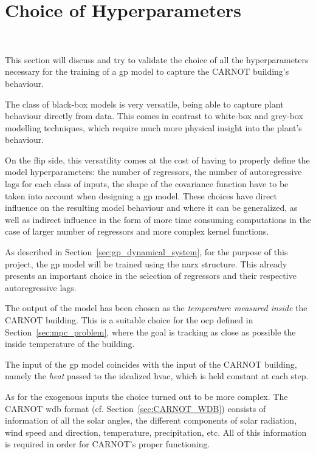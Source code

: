 \section{Choice of Hyperparameters}~\label{sec:hyperparameters}

This section will discuss and try to validate the choice of all the
hyperparameters necessary for the training of a \acrshort{gp} model to capture
the CARNOT building's behaviour.

The class of black-box models is very versatile, being able to capture plant
behaviour directly from data. This comes in contrast to white-box and grey-box
modelling techniques, which require much more physical insight into the plant's
behaviour.

On the flip side, this versatility comes at the cost of having to properly
define the model hyperparameters: the number of regressors, the number of
autoregressive lags for each class of inputs, the shape of the covariance
function have to be taken into account when designing a \acrshort{gp} model.
These choices have direct influence on the resulting model behaviour and where
it can be generalized, as well as indirect influence in the form of more time
consuming computations in the case of larger number of regressors and more
complex kernel functions.

As described in Section~\ref{sec:gp_dynamical_system}, for the purpose of this
project, the \acrlong{gp} model will be trained using the \acrshort{narx}
structure. This already presents an important choice in the selection of
regressors and their respective autoregressive lags.

The output of the model has been chosen as the \textit{temperature measured
inside} the CARNOT building. This is a suitable choice for the \acrshort{ocp}
defined in Section~\ref{sec:mpc_problem}, where the goal is tracking as close as
possible the inside temperature of the building.

The input of the \acrshort{gp} model coincides with the input of the CARNOT
building, namely the \textit{heat} passed to the idealized \acrshort{hvac},
which is held constant at each step.

As for the exogenous inputs the choice turned out to be more complex. The CARNOT
\acrshort{wdb} format (cf. Section~\ref{sec:CARNOT_WDB}) consists of information
of all the solar angles, the different components of solar radiation, wind speed
and direction, temperature, precipitation, etc. All of this information is
required in order for CARNOT's proper functioning. 

